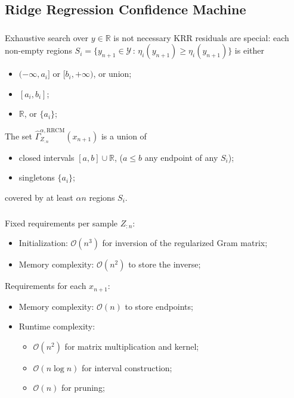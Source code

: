 \documentclass[t]{beamer}  %
\newcommand{\Ycal}{\mathcal{Y}}
\newcommand{\Ocal}{\mathcal{O}}
\newcommand{\Real}{\mathbb{R}}
\begin{document}
\subsection{Ridge Regression Confidence Machine} %
\label{sub:ridge_regression_confidence_machine}

\begin{frame}[c]\frametitle{\insertsection}
  \framesubtitle{\insertsubsection}
  \begin{block}{Exhaustive search over $y\in \Real$ is not necessary}
    KRR residuals are special: each non-empty regions
    $S_i = \{y_{n+1}\in \Ycal \,:\, \eta_i(y_{n+1}) \geq \eta_i(y_{n+1})\}$
    is either \begin{itemize}
      \item $(-\infty, a_i]$ or $[b_i, +\infty)$, or union;
      \item $[a_i, b_i]$;
      \item $\Real$, or $\{a_i\}$;
    \end{itemize}
    \vspace{\baselineskip}
    The set $\hat{\Gamma}_{Z_{:n}}^{\alpha, \text{RRCM}}(x_{n+1})$ is a union of
    \begin{itemize}
      \item closed intervals $[a, b]\cup\Real$, ($a\leq b$ any endpoint of any $S_i$);
      \item singletons $\{a_i\}$;
    \end{itemize}
    covered by at least $\alpha n$ regions $S_i$.
  \end{block}
\end{frame}

\begin{frame}[c]\frametitle{\insertsection}
\framesubtitle{\insertsubsection}
  Fixed requirements per sample $Z_{:n}$: \begin{itemize}
    \item Initialization: $\Ocal(n^3)$ for inversion of the regularized Gram matrix;
    \item Memory complexity: $\Ocal(n^2)$ to store the inverse;
  \end{itemize}
  \vspace{\baselineskip}
  Requirements for each $x_{n+1}$:
  \begin{itemize}
    \item Memory complexity: $\Ocal(n)$ to store endpoints;
    \item Runtime complexity: \begin{itemize}
      \item $\Ocal(n^2)$ for matrix multiplication and kernel;
      \item $\Ocal(n \log n)$ for interval construction;
      \item $\Ocal(n)$ for pruning;
    \end{itemize}
  \end{itemize}
\end{frame}
\end{document}
